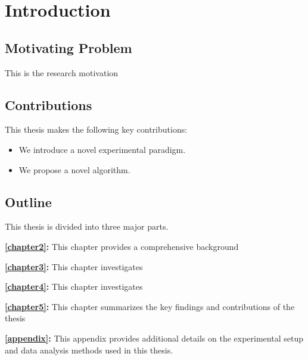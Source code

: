 \chapter{Introduction}
\label{chapter1}

\section{Motivating Problem}
\label{ch1:sec:motivation}
\begin{paragraph}
This is the research motivation 
\end{paragraph}




\section{Contributions}
\label{ch1:sec:Contributions}
\begin{paragraph}
This thesis makes the following key contributions:
\end{paragraph}

\begin{itemize}[leftmargin=\paritemindent]
    \item We introduce a novel experimental paradigm.
    \item We propose a novel algorithm.
\end{itemize}


\section{Outline}
\label{ch1:sec:Outline}
\begin{paragraph}
This thesis is divided into three major parts.

\textbf{\autoref{chapter2}:} This chapter provides a comprehensive background

\textbf{\autoref{chapter3}:} This chapter investigates

\textbf{\autoref{chapter4}:} This chapter investigates

\textbf{\autoref{chapter5}:} This chapter summarizes the key findings and contributions of the thesis

\textbf{\autoref{appendix}:} This appendix provides additional details on the experimental setup and data analysis methods used in this thesis.

\end{paragraph}
